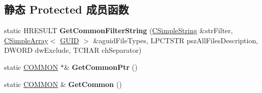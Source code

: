 \subsection*{静态 Protected 成员函数}
\begin{DoxyCompactItemize}
\item 
\mbox{\label{class_a_t_l_1_1_c_image_aaecf7dfecc383d95375235ea9f9925e4}} 
static H\+R\+E\+S\+U\+LT {\bfseries Get\+Common\+Filter\+String} (\hyperlink{class_a_t_l_1_1_c_simple_string_t}{C\+Simple\+String} \&str\+Filter, \hyperlink{class_a_t_l_1_1_c_simple_array}{C\+Simple\+Array}$<$ \hyperlink{interface_g_u_i_d}{G\+U\+ID} $>$ \&aguid\+File\+Types, L\+P\+C\+T\+S\+TR psz\+All\+Files\+Description, D\+W\+O\+RD dw\+Exclude, T\+C\+H\+AR ch\+Separator)
\item 
\mbox{\label{class_a_t_l_1_1_c_image_acc1dbbdf8d989d2947b939cebd31a7ba}} 
static \hyperlink{struct_a_t_l_1_1_c_image_1_1_c_o_m_m_o_n}{C\+O\+M\+M\+ON} $\ast$\& {\bfseries Get\+Common\+Ptr} ()
\item 
\mbox{\label{class_a_t_l_1_1_c_image_a5f62d367e3e04e2299c448db69c9c7c9}} 
static \hyperlink{struct_a_t_l_1_1_c_image_1_1_c_o_m_m_o_n}{C\+O\+M\+M\+ON} \& {\bfseries Get\+Common} ()
\end{DoxyCompactItemize}
